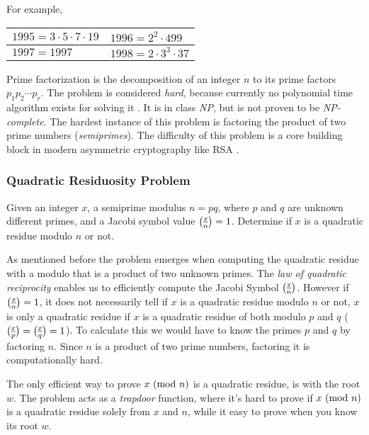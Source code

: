For example,

\begin{center}
	\begin{tabular}{|l|l|}
		\hline
		$1995 = 3 \cdot 5 \cdot 7 \cdot 19$ & 
		$1996 = 2^2 \cdot 499$ \\
		\hline
		$1997 = 1997$ &
		$1998 = 2 \cdot 3^3 \cdot 37$\\
		\hline
	\end{tabular}
\end{center}


Prime factorization is the decomposition of an integer $n$ to its prime factors $p_1 p_2 \cdots p_r$.
The problem is considered \textit{hard}, because currently no polynomial time algorithm exists for solving it \cite{Buchmann2001}. It is in class \textit{NP}, but is not proven to be \textit{NP-complete}.
The hardest instance of this problem is factoring the product of two prime numbers (\textit{semiprimes}).
The difficulty of this problem is a core building block in modern asymmetric cryptography like RSA \cite{rivest1978method}.

\subsubsection{Quadratic Residuosity Problem}

\begin{definition}
	Given an integer $x$, a semiprime modulus $n = pq$, where $p$ and $q$ are unknown different primes, and a Jacobi symbol value $\legendre{x}{n} = 1$.
Determine if $x$ is a quadratic residue modulo $n$ or not.
\end{definition}
As mentioned before the problem emerges when computing the quadratic residue with a modulo that is a product of two unknown primes.
The \textit{law of quadratic reciprocity} enables us to efficiently compute the Jacobi Symbol $\legendre{x}{n}$.
However if $\legendre{x}{n} = 1$, it does not necessarily tell if $x$ is a quadratic residue modulo $n$ or not, $x$ is only a quadratic residue if $x$ is a quadratic residue of both modulo $p$ and $q$ ($\legendre{x}{p} = \legendre{x}{q} = 1$).
To calculate this we would have to know the primes $p$ and $q$ by factoring $n$.
Since $n$ is a product of two prime numbers, factoring it is computationally hard.

The only efficient way to prove $x \ (\mathrm{mod}\ n)$ is a quadratic residue, is with the root $w$.
The problem acts as a \textit{trapdoor} function, where it's hard to prove if $x \ (\mathrm{mod}\ n)$ is a quadratic residue solely from $x$ and $n$, while it easy to prove when you know its root $w$.

